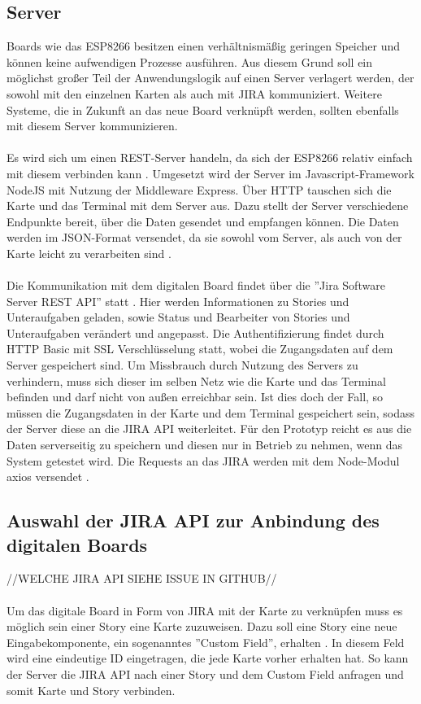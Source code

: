 \documentclass[12pt,titlepage]{scrartcl}
\begin{document}
		\subsection{Server} \label{techserver}
		Boards wie das ESP8266 besitzen einen verhältnismäßig geringen Speicher und können keine aufwendigen Prozesse ausführen. Aus diesem Grund soll ein möglichst großer Teil der Anwendungslogik auf einen Server verlagert werden, der sowohl mit den einzelnen Karten als auch mit JIRA kommuniziert. Weitere Systeme, die in Zukunft an das neue Board verknüpft werden, sollten ebenfalls mit diesem Server kommunizieren. \\ \\
		Es wird sich um einen REST-Server handeln, da sich der ESP8266 relativ einfach mit diesem verbinden kann \cite{nodemcuexamples}. Umgesetzt wird der Server im Javascript-Framework NodeJS mit Nutzung der Middleware Express. Über HTTP tauschen sich die Karte und das Terminal mit dem Server aus. Dazu stellt der Server verschiedene Endpunkte bereit, über die Daten gesendet und empfangen können. Die Daten werden im JSON-Format versendet, da sie sowohl vom Server, als auch von der Karte leicht zu verarbeiten sind \cite{arduinojson}. \\ \\
		Die Kommunikation mit dem digitalen Board findet über die ''Jira Software Server REST API'' statt \cite{jiraapi}. Hier werden Informationen zu Stories und Unteraufgaben geladen, sowie Status und Bearbeiter von Stories und Unteraufgaben verändert und angepasst. Die Authentifizierung findet durch HTTP Basic mit SSL Verschlüsselung statt, wobei die Zugangsdaten auf dem Server gespeichert sind. Um Missbrauch durch Nutzung des Servers zu verhindern, muss sich dieser im selben Netz wie die Karte und das Terminal befinden und darf nicht von außen erreichbar sein. Ist dies doch der Fall, so müssen die Zugangsdaten in der Karte und dem Terminal gespeichert sein, sodass der Server diese an die JIRA API weiterleitet. Für den Prototyp reicht es aus die Daten serverseitig zu speichern und diesen nur in Betrieb zu nehmen, wenn das System getestet wird. Die Requests an das JIRA werden mit dem Node-Modul axios versendet \cite{npmaxios}.
		\subsection{Auswahl der JIRA API zur Anbindung des digitalen Boards}
		//WELCHE JIRA API SIEHE ISSUE IN GITHUB// \\ \\
		Um das digitale Board in Form von JIRA mit der Karte zu verknüpfen muss es möglich sein einer Story eine Karte zuzuweisen. Dazu soll eine Story eine neue Eingabekomponente, ein sogenanntes ''Custom Field'', erhalten \cite{jiracustomfield}. In diesem Feld wird eine eindeutige ID eingetragen, die jede Karte vorher erhalten hat. So kann der Server die JIRA API nach einer Story und dem Custom Field anfragen und somit Karte und Story verbinden. 
	\newpage
\end{document}

